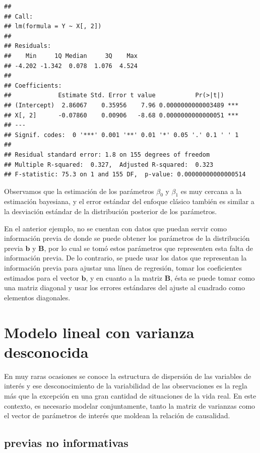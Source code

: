 \begin{Eje}
\begin{knitrout}
\begin{kframe}
\begin{verbatim}
## 
## Call:
## lm(formula = Y ~ X[, 2])
## 
## Residuals:
##    Min     1Q Median     3Q    Max 
## -4.202 -1.342  0.078  1.076  4.524 
## 
## Coefficients:
##             Estimate Std. Error t value           Pr(>|t|)    
## (Intercept)  2.86067    0.35956    7.96 0.0000000000003489 ***
## X[, 2]      -0.07860    0.00906   -8.68 0.0000000000000051 ***
## ---
## Signif. codes:  0 '***' 0.001 '**' 0.01 '*' 0.05 '.' 0.1 ' ' 1
## 
## Residual standard error: 1.8 on 155 degrees of freedom
## Multiple R-squared:  0.327,	Adjusted R-squared:  0.323 
## F-statistic: 75.3 on 1 and 155 DF,  p-value: 0.00000000000000514
\end{verbatim}
\end{kframe}
\end{knitrout}
Observamos que la estimación de los parámetros $\beta_0$ y $\beta_1$ es muy cercana a la estimación bayesiana, y el error estándar del enfoque clásico también es similar a la desviación estándar de la distribución posterior de los parámetros. 
\end{Eje}

En el anterior ejemplo, no se cuentan con datos que puedan servir como información previa de donde se puede obtener los parámetros de la distribución previa $\mathbf{b}$ y $\mathbf{B}$, por lo cual se tomó estos parámetros que representen esta falta de información previa. De lo contrario, se puede usar los datos que representan la información previa para ajustar una línea de regresión, tomar los coeficientes estimados para el vector $\mathbf{b}$, y en cuanto a la matriz $\mathbf{B}$, ésta se puede tomar como una matriz diagonal y usar los errores estándares del ajuste al cuadrado como elementos diagonales.

\section{Modelo lineal con varianza desconocida}

En muy raras ocasiones se conoce la estructura de dispersión de las variables de interés y ese desconocimiento de la variabilidad de las observaciones es la regla más que la excepción en una gran cantidad de situaciones de la vida real. En este contexto, es necesario modelar conjuntamente, tanto la matriz de varianzas como el vector de parámetros de interés que moldean la relación de causalidad.

\subsection{previas no informativas}

